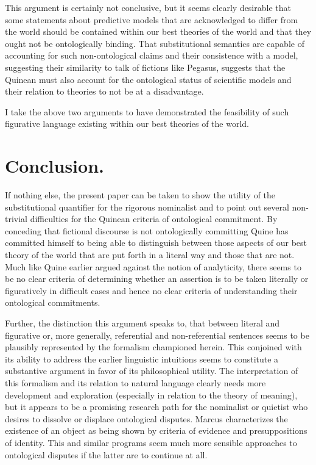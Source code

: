 \documentclass[12pt,a4paper]{article}
\begin{document}
This argument is certainly not conclusive, but it seems clearly
desirable that some statements about predictive models that are
acknowledged to differ from the world should be contained within our
best theories of the world and that they ought not be ontologically
binding.  That substitutional semantics are capable of accounting for
such non-ontological claims and their consistence with a model,
suggesting their similarity to talk of fictions like Pegasus, suggests
that the Quinean must also account for the ontological status of
scientific models and their relation to theories to not be at a
disadvantage.

I take the above two arguments to have demonstrated the feasibility of
such figurative language existing within our best theories of the
world.


\section{Conclusion.}

If nothing else, the present paper can be taken to show the utility of
the substitutional quantifier for the rigorous nominalist and to point
out several non-trivial difficulties for the Quinean criteria of
ontological commitment.  By conceding that fictional discourse is not
ontologically committing Quine has committed himself to being able to
distinguish between those aspects of our best theory of the world that
are put forth in a literal way and those that are not.  Much like Quine
earlier argued against the notion of analyticity, there seems to be no
clear criteria of determining whether an assertion is to be taken
literally or figuratively in difficult cases and hence no clear
criteria of understanding their ontological commitments.

Further, the distinction this argument speaks to, that between literal
and figurative or, more generally, referential and non-referential
sentences seems to be plausibly represented by the formalism
championed herein.  This conjoined with its ability to address the
earlier linguistic intuitions seems to constitute a substantive
argument in favor of its philosophical utility. The interpretation of
this formalism and its relation to natural language clearly needs more
development and exploration (especially in relation to the theory of
meaning), but it appears to be a promising research path for the
nominalist or quietist who desires to dissolve or displace ontological
disputes. Marcus \cite{marcus72} characterizes the existence of an
object as being shown by criteria of evidence and presuppositions of
identity.  This and similar programs seem much more sensible
approaches to ontological disputes if the latter are to continue at
all.


\newpage

{}
\end{document}
